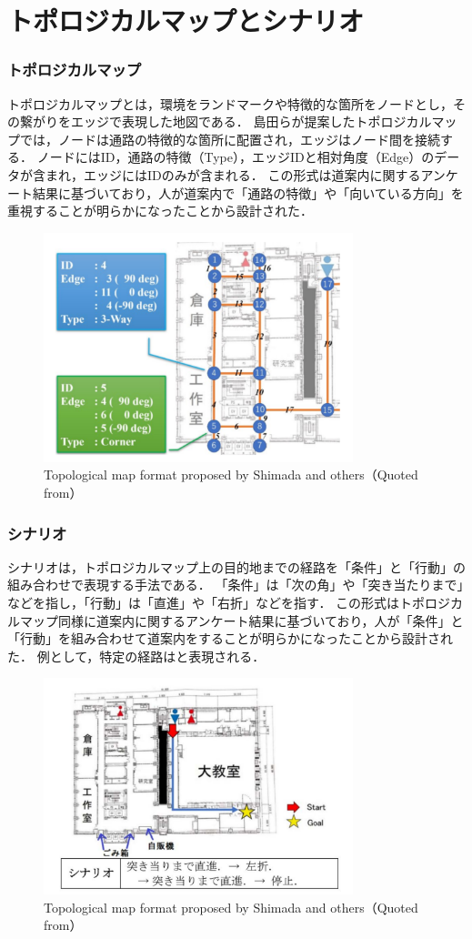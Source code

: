 \section{トポロジカルマップとシナリオ}
\subsubsection{トポロジカルマップ}
トポロジカルマップとは，環境をランドマークや特徴的な箇所をノードとし，その繋がりをエッジで表現した地図である．
島田らが提案したトポロジカルマップでは，ノードは通路の特徴的な箇所に配置され，エッジはノード間を接続する．
ノードにはID，通路の特徴（Type），エッジIDと相対角度（Edge）のデータが含まれ，エッジにはIDのみが含まれる．
この形式は道案内に関するアンケート結果に基づいており，人が道案内で「通路の特徴」や「向いている方向」を重視することが明らかになったことから設計された．

\begin{figure}[htbp]
  \centering
   \includegraphics[width=90mm]{images/pdf/shimada/topo.pdf}
   \caption[Topological map format proposed by Shimada and others]{Topological map format proposed by Shimada and others（Quoted from\cite{shimada2020}）}
   \label{fig:topo}
\end{figure}

\subsubsection{シナリオ}
シナリオは，トポロジカルマップ上の目的地までの経路を「条件」と「行動」の組み合わせで表現する手法である．
「条件」は「次の角」や「突き当たりまで」などを指し，「行動」は「直進」や「右折」などを指す．
この形式はトポロジカルマップ同様に道案内に関するアンケート結果に基づいており，人が「条件」と「行動」を組み合わせて道案内をすることが明らかになったことから設計された．
例として，特定の経路はと表現される．

\clearpage
\begin{figure}[htbp]
  \centering
   \includegraphics[width=90mm]{images/pdf/shimada/scenario.pdf}
   \caption{Topological map format proposed by Shimada and others（Quoted from\cite{shimada2020}）}
   \label{fig:topo}
\end{figure}